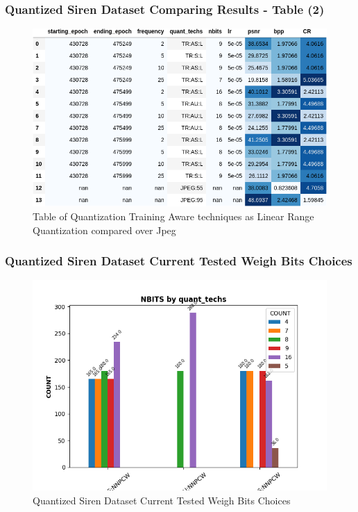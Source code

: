 \begin{frame}
\frametitle{Quantized Siren Dataset Comparing Results -  Table (2)}


\begin{figure}
\includegraphics[scale=0.5]{slides/experiments/quant_dataset/a_table_2.png}
\caption{Table of Quantization Training Aware techniques as Linear Range Quantization compared over Jpeg}
\end{figure}

\end{frame}


\begin{frame}
\frametitle{Quantized Siren Dataset Current Tested Weigh Bits Choices}


\begin{figure}
\includegraphics[scale=0.5]{slides/experiments/quant_dataset/nbits_vs_quant_techs_count_barplot.png}
\caption{Quantized Siren Dataset Current Tested Weigh Bits Choices}
\end{figure}

\end{frame}

